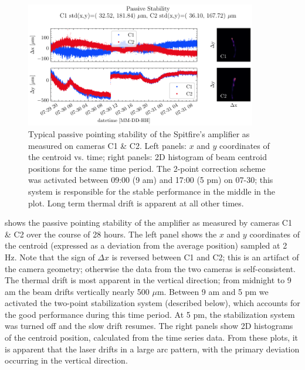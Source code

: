 \begin{figure}
	\centering
	\includegraphics[width=0.9\textwidth]{figures/chap2/Stability_NoCorrection.pdf}
	\caption{Typical passive pointing stability of the Spitfire's amplifier as measured on cameras C1 \& C2. Left panels: $x$ and $y$ coordinates of the centroid vs. time; right panels: 2D histogram of beam centroid positions for the same time period. The 2-point correction scheme was activated between 09:00 (9 am) and 17:00 (5 pm) on 07-30; this system is responsible for the stable performance in the middle in the plot. Long term thermal drift is apparent at all other times.}
	\label{fig:guidestar_passive_stability}
\end{figure}

 shows the passive pointing stability of the amplifier as measured by cameras C1 \& C2 over the course of 28 hours. The left panel shows the $x$ and $y$ coordinates of the centroid (expressed as a deviation from the average position) sampled at 2 Hz. Note that the sign of $\Delta x$ is reversed between C1 and C2; this is an artifact of the camera geometry; otherwise the data from the two cameras is self-consistent. The thermal drift is most apparent in the vertical direction; from midnight to 9 am the beam drifts vertically nearly 500 $\mu$m. Between 9 am and 5 pm we activated the two-point stabilization system (described below), which accounts for the good performance during this time period. At 5 pm, the stabilization system was turned off and the slow drift resumes. The right panels show 2D histograms of the centroid position, calculated from the time series data. From these plots, it is apparent that the laser drifts in a large arc pattern, with the primary deviation occurring in the vertical direction.

